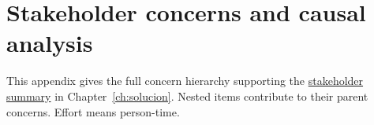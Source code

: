 \chapter{Stakeholder concerns and causal analysis}
\label{appendix:stakeholder-concerns}

\begingroup
\renewcommand{\baselinestretch}{1.0}
\small
\setlength{\parskip}{0.3ex}
\renewcommand{\ConcernRole}[1]{\par\Needspace{4\baselineskip}\subsubsection*{#1}}
\renewcommand{\ConcernRoot}[2]{%
  \par\addvspace{.3\baselineskip}\Needspace{3\baselineskip}%
  \begingroup\raggedright
  \ConcernAnchor{#1}\noindent\textbf{\ConcernId{#1}}\quad #2\par\endgroup}

This appendix gives the full concern hierarchy supporting the \hyperref[sec:stakeholder-concerns]{stakeholder summary} in Chapter~\ref{ch:solucion}. Nested items contribute to their parent concerns. Effort means person-time.


